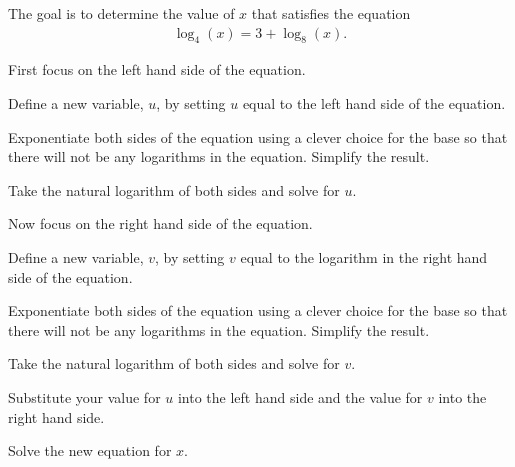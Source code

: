 \begin{problem}
\item The goal is to determine the value of $x$ that satisfies the
  equation
  \begin{eqnarray*}
    \log_4(x) = 3 + \log_8(x).
  \end{eqnarray*}
  \vspace{-2em}
  \begin{subproblem}
  \item First focus on the left hand side of the equation.
    \begin{subsubproblem}
    \item Define a new variable, $u$, by setting $u$ equal to the left
      hand side of the equation.
      \vspace{1em}
    \item Exponentiate both sides of the equation using a clever
      choice for the base so that there will not be any logarithms in
      the equation. Simplify the result.
      \vspace{2em}
    \item Take the natural logarithm of both sides and solve for $u$.
      \vspace{2em}
    \end{subsubproblem}
  \item Now focus on the right hand side of the equation.
    \begin{subsubproblem}
    \item Define a new variable, $v$, by setting $v$ equal to the
      logarithm in the right hand side of the equation.
      \vspace{1em}
    \item Exponentiate both sides of the equation using a clever
      choice for the base so that there will not be any logarithms in
      the equation. Simplify the result.
      \vspace{2em}
    \item Take the natural logarithm of both sides and solve for $v$.
      \vspace{2em}
    \end{subsubproblem}
  \item Substitute your value for $u$ into the left hand side and the
    value for $v$ into the right hand side.
    \vspace{1em}
  \item Solve the new equation for $x$.
    \vfill
  \end{subproblem}

\clearpage


\end{problem}
